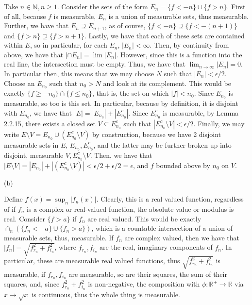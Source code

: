 \documentclass[10pt]{article}
\begin{document}
Take $n \in \mathbb{N}, n \geq 1$. Consider the sets of the form $E_n = \{ f < -n \} \cup \{ f > n \}$. First of all, because $f$ is measurable, $E_n$ is a union of measurable sets, thus measurable. Further, we have that  $E_n \supseteq E_{n+1}$, as of course, $\{ f < -n \} \supseteq \{ f < -(n+1) \}$ and $\{ f > n \} \supseteq \{ f > n+1 \}$. Lastly, we have that each of these sets are contained within $E$, so in particular, for each $E_n$, $|E_n| < \infty$. Then, by continuity from above, we have that $|\cap E_n| = \lim |E_n|$. However, since this is a function into the real line, the intersection must be empty. Thus, we have that $\lim_{n\to \infty} |E_n| = 0$. In particular then, this means that we may choose $N$ such that $|E_n| < \epsilon/2$. Choose an $E_{n_0}$ such that $n_0 > N$ and look at its complement. This would be exactly $\{ f \geq - n_0 \} \cap \{ f  \leq n_0 \}$, that is, the set on which $|f| < n_0$. Since $E_{n_0}$ is measurable, so too is this set. In particular, because by definition, it is disjoint with $E_{n_0}$, we have that $|E| = |E_{n_0}| + |E_{n_0}^c|$. Since $E_{n_0}^c$ is measurable, by Lemma 2.2.15, there exists a closed set $V \subseteq E_{n_0}^c$ such that $|E_{n_0}^c \setminus V| < \epsilon/2$. Finally, we may write $E \setminus V = E_{n_0} \cup (E_{n_0}^c \setminus V)$ by construction, because we have 2 disjoint measurable sets in $E$, $E_{n_0}, E_{n_0}^c$, and the latter may be further broken up into disjoint, measurable $V, E_{n_0}^c \setminus V$. Then, we have that $|E \setminus V| = |E_{n_0}| + |(E_{n_0}^c \setminus V)|< \epsilon/2 + \epsilon/2 = \epsilon$, and $f$ bounded above by $n_0$ on $V$.

(b)

Define $f(x)  = \sup_n |f_n(x)|$. Clearly, this is a real valued function, regardless of if $f_n$ is a complex or real-valued function, the absolute value or modulus is real. Consider $\{ f > a \}$ if $f_n$ are real valued. This would be exactly $\cap_n (\{ f_n < -a \} \cup \{ f_n > a \})$, which is a countable intersection of a union of measurable sets, thus, measurable. If $f_n$ are complex valued, then we have that $|f_n|= \sqrt{f_{r_n}^2 + f_{i_n}^2}$, where $f_{r_n},f_{i_n}$ are the real, imaginary components of $f_n$. In particular, these are measurable real valued functions, thus $ \sqrt{f_{r_n}^2 + f_{i_n}^2}$ is measurable, if $f_{r_n},f_{i_n}$ are measurable, so are their squares, the sum of their squares, and, since $f_{r_n}^2 + f_{i_n}^2$ is non-negative, the composition with $\phi: \mathbb{R}^+ \to \mathbb{R}$ via $x \to \sqrt{x}$ is continuous, thus the whole thing is measurable.
\end{document}
